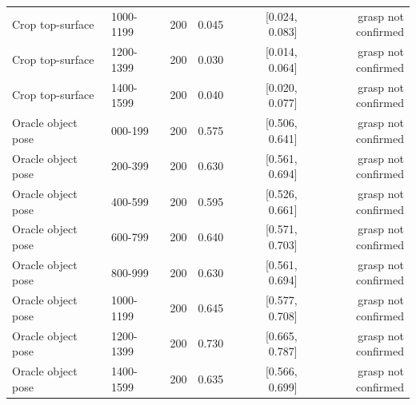 \begin{tabular}{llrrrr}
Crop top-surface & 1000-1199 & 200 & 0.045 & [0.024, 0.083] & grasp not confirmed \\
Crop top-surface & 1200-1399 & 200 & 0.030 & [0.014, 0.064] & grasp not confirmed \\
Crop top-surface & 1400-1599 & 200 & 0.040 & [0.020, 0.077] & grasp not confirmed \\
Oracle object pose & 000-199 & 200 & 0.575 & [0.506, 0.641] & grasp not confirmed \\
Oracle object pose & 200-399 & 200 & 0.630 & [0.561, 0.694] & grasp not confirmed \\
Oracle object pose & 400-599 & 200 & 0.595 & [0.526, 0.661] & grasp not confirmed \\
Oracle object pose & 600-799 & 200 & 0.640 & [0.571, 0.703] & grasp not confirmed \\
Oracle object pose & 800-999 & 200 & 0.630 & [0.561, 0.694] & grasp not confirmed \\
Oracle object pose & 1000-1199 & 200 & 0.645 & [0.577, 0.708] & grasp not confirmed \\
Oracle object pose & 1200-1399 & 200 & 0.730 & [0.665, 0.787] & grasp not confirmed \\
Oracle object pose & 1400-1599 & 200 & 0.635 & [0.566, 0.699] & grasp not confirmed \\
\bottomrule
\end{tabular}
